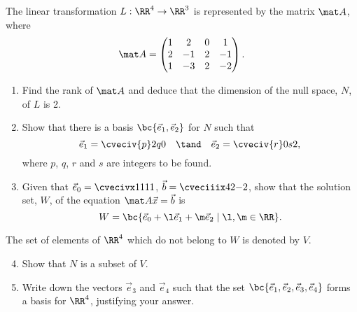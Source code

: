 \begin{problem}
    The linear transformation $L : \RR^4 \to \RR^3$ is represented by the matrix $\mat A$, where \[\mat A = \begin{pmatrix}1 & 2 & 0 & 1 \\ 2 & -1 & 2 & -1 \\ 1 & -3 & 2 & -2\end{pmatrix}.\]

    \begin{enumerate}
        \item Find the rank of $\mat A$ and deduce that the dimension of the null space, $N$, of $L$ is 2.
        \item Show that there is a basis $\bc{\vec e_1, \vec e_2}$ for $N$ such that \[\vec e_1 = \cveciv{p}2q0 \quad \tand \quad \vec e_2 = \cveciv{r}0s2,\] where $p$, $q$, $r$ and $s$ are integers to be found.
        \item Given that $\vec e_0 = \cvecivx1111$, $\vec b = \cveciiix42{-2}$, show that the solution set, $W$, of the equation $\mat A \vec x = \vec b$ is \[W = \bc{\vec e_0 + \l \vec e_1 + \m \vec e_2 \mid \l, \m \in \RR}.\]
    \end{enumerate}

    The set of elements of $\RR^4$ which do not belong to $W$ is denoted by $V$.

    \begin{enumerate}
        \setcounter{enumi}{3}
        \item Show that $N$ is a subset of $V$.
        \item Write down the vectors $\vec e_3$ and $\vec e_4$ such that the set $\bc{\vec e_1, \vec e_2, \vec e_3, \vec e_4}$ forms a basis for $\RR^4$, justifying your answer.
    \end{enumerate}
\end{problem}
